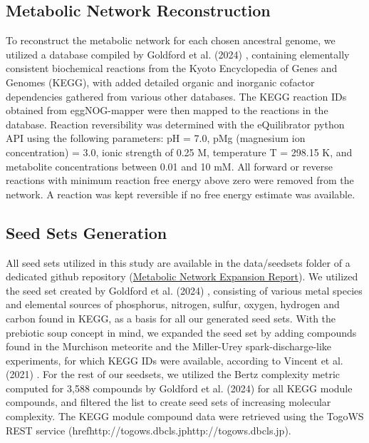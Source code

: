 \subsection*{Metabolic Network Reconstruction}


To reconstruct the metabolic network for each chosen ancestral genome, we utilized a database compiled by Goldford et al. (2024) \cite{goldford2024}, containing elementally consistent biochemical reactions from the Kyoto Encyclopedia of Genes and Genomes (KEGG), with added detailed organic and inorganic cofactor dependencies gathered from various other databases. The KEGG reaction IDs obtained from eggNOG-mapper were then mapped to the reactions in the database. Reaction reversibility was determined with the eQuilibrator python API \cite{beber2022} using the following parameters: pH = 7.0, pMg (magnesium ion concentration) = 3.0, ionic strength of 0.25 M, temperature T = 298.15 K, and metabolite concentrations between 0.01 and 10 mM. All forward or reverse reactions with minimum reaction free energy above zero were removed from the network. A reaction was kept reversible if no free energy estimate was available.

\subsection*{Seed Sets Generation}

All seed sets utilized in this study are available in the data/seedsets folder of a dedicated github repository (\href{https://github.com/astrademertzi/metnetexp_report}{Metabolic Network Expansion Report}). We utilized the seed set created by Goldford et al. (2024) \cite{goldford2024}, consisting of various metal species and elemental sources of phosphorus, nitrogen, sulfur, oxygen, hydrogen and carbon found in KEGG, as a basis for all our generated seed sets. With the prebiotic soup concept in mind, we expanded the seed set by adding compounds found in the Murchison meteorite and the Miller-Urey spark-discharge-like experiments, for which KEGG IDs were available, according to Vincent et al. (2021) \cite{vincent2021}. For the rest of our seedsets, we utilized the Bertz complexity metric computed for 3,588 compounds by Goldford et al. (2024) for all KEGG module compounds, and filtered the list to create seed sets of increasing molecular complexity. The KEGG module compound data were retrieved using the TogoWS REST service (href{http://togows.dbcls.jp}{http://togows.dbcls.jp}).


